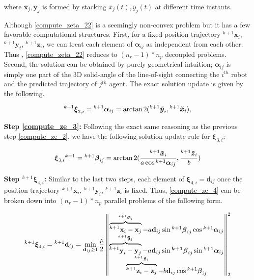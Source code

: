  \noindent where $\overline{\textbf{x}}_{j}, \overline{\textbf{y}}_{j}$ is formed by stacking $\overline{x}_j(t), \overline{y}_j(t) $ at different time instants.

Although \eqref{compute_zeta_22}  is a seemingly non-convex problem but it has a few favorable computational structures. First, for a fixed position trajectory ${^{k+1}}\boldsymbol{x}_{i}$,  ${^{k+1}}\boldsymbol{y}_{i}$, ${^{k+1}}\boldsymbol{z}_{i}$, we can treat each element of $\boldsymbol{\alpha}_{ij}$ as independent from each other. Thus , \eqref{compute_zeta_22} reduces to $(n_{r}-1)*n_p$ decoupled problems. Second, the solution can be obtained by purely geometrical intuition; $\boldsymbol{\alpha}_{ij}$ is simply one part of the 3D solid-angle of the line-of-sight connecting the $i^{th}$ robot and the predicted trajectory of $j^{th}$ agent. The exact solution update is given by the following. 

\begin{align}
 {^{k+1}}\boldsymbol{\xi}_{2, i} = {^{k+1}}\boldsymbol{\alpha}_{ij} = \arctan2 ({^{k+1}}\boldsymbol{\Tilde{y}}_{i}, {^{k+1}}\boldsymbol{\Tilde{x}}_{i}),
\label{alpha_sol}
\end{align}

\noindent \textbf{Step \eqref{compute_ze_3}:} Following the exact same reasoning as the previous step \eqref{compute_ze_2}, we have the following solution update rule for $\boldsymbol{\xi}_{3, i}$:

 \begin{align}
\boldsymbol{\xi}_{3, i}{^{k+1}} = {^{k+1}}\boldsymbol{\beta}_{ij} = \arctan2(\frac{{^{k+1}}\boldsymbol{\Tilde{x}}_{i}}{a \cos{{^{k+1}}\boldsymbol{\alpha}_{ij}}}, \frac{{^{k+1}}\boldsymbol{\Tilde{z}}_{i}}{b} )
\label{beta_sol}
 \end{align}
 

\noindent \textbf{Step ${^{k+1}}\boldsymbol{\xi}_{4,i}$:} Similar to the last two steps, each element of $\boldsymbol{\xi}_{4, i} = \textbf{d}_{ij}$ once the position trajectory ${^{k+1}}\boldsymbol{x}_{i}$,  ${^{k+1}}\boldsymbol{y}_{i}$, ${^{k+1}}\boldsymbol{z}_{i}$ is fixed. Thus, \eqref{compute_ze_4} can be broken down into $(n_r-1)*n_p$ parallel problems of the  following form.  



\begin{align}
{^{k+1}}\boldsymbol{\xi}_{4, i} = {^{k+1}}\textbf{d}_{ij} =   \min_{\textbf{d}_{ij}\geq 1} 
\frac{\rho}{2} 
\left\Vert  \begin{matrix}
 \overbrace{  
  {^{k+1}}\textbf{x}_{i} - \textbf{x}_{j}
}^{{^{k+1}}\boldsymbol{\Tilde{x}}_{i}}
 -a\textbf{d}_{ij} \sin{{^{k+1}}\boldsymbol{\beta}_{ij}}\cos{{^{k+1}}\boldsymbol{\alpha}_{ij}} 
\\
 \overbrace{
  {^{k+1}}\textbf{y}_{i} -  \textbf{y}_{j}
 }^{{^{k+1}}\boldsymbol{\Tilde{y}}_{i}}
 -a\textbf{d}_{ij}\sin{\boldsymbol{{^{k+1}}\beta}_{ij}}\sin{{^{k+1}}\boldsymbol{\alpha}_{ij}} \\
  \overbrace{
  {^{k+1}}\textbf{z}_{i} -  \textbf{z}_{j}
 }^{{^{k+1}}\boldsymbol{\Tilde{z}}_{i}}
 -b\textbf{d}_{ij}\cos{{^{k+1}}\boldsymbol{\beta}_{ij}}
 \end{matrix}
 \right \Vert_2^2 
 \label{compute_zeta_42}  
 \end{align}

